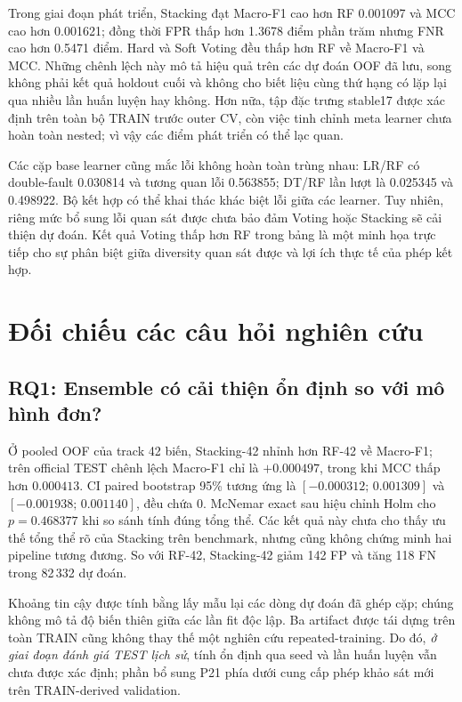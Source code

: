 Trong giai đoạn phát triển, Stacking đạt Macro-F1 cao hơn RF 0.001097 và MCC cao hơn 0.001621; đồng thời FPR thấp hơn 1.3678 điểm phần trăm nhưng FNR cao hơn 0.5471 điểm. Hard và Soft Voting đều thấp hơn RF về Macro-F1 và MCC. Những chênh lệch này mô tả hiệu quả trên các dự đoán OOF đã lưu, song không phải kết quả holdout cuối và không cho biết liệu cùng thứ hạng có lặp lại qua nhiều lần huấn luyện hay không. Hơn nữa, tập đặc trưng stable17 được xác định trên toàn bộ TRAIN trước outer CV, còn việc tinh chỉnh meta learner chưa hoàn toàn nested; vì vậy các điểm phát triển có thể lạc quan.

Các cặp base learner cũng mắc lỗi không hoàn toàn trùng nhau: LR/RF có double-fault 0.030814 và tương quan lỗi 0.563855; DT/RF lần lượt là 0.025345 và 0.498922. Bộ kết hợp có thể khai thác khác biệt lỗi giữa các learner. Tuy nhiên, riêng mức bổ sung lỗi quan sát được chưa bảo đảm Voting hoặc Stacking sẽ cải thiện dự đoán. Kết quả Voting thấp hơn RF trong bảng là một minh họa trực tiếp cho sự phân biệt giữa diversity quan sát được và lợi ích thực tế của phép kết hợp.

\section{Đối chiếu các câu hỏi nghiên cứu}
\label{sec:revision-rq-all}

\subsection{RQ1: Ensemble có cải thiện ổn định so với mô hình đơn?}
\label{sec:revision-rq1}
Ở pooled OOF của track 42 biến, Stacking-42 nhỉnh hơn RF-42 về Macro-F1; trên official TEST chênh lệch Macro-F1 chỉ là $+0.000497$, trong khi MCC thấp hơn $0.000413$. CI paired bootstrap 95\% tương ứng là $[-0.000312;\,0.001309]$ và $[-0.001938;\,0.001140]$, đều chứa 0. McNemar exact sau hiệu chỉnh Holm cho $p=0.468377$ khi so sánh tính đúng tổng thể. Các kết quả này chưa cho thấy ưu thế tổng thể rõ của Stacking trên benchmark, nhưng cũng không chứng minh hai pipeline tương đương. So với RF-42, Stacking-42 giảm 142 FP và tăng 118 FN trong 82\,332 dự đoán.

Khoảng tin cậy được tính bằng lấy mẫu lại các dòng dự đoán đã ghép cặp; chúng không mô tả độ biến thiên giữa các lần fit độc lập. Ba artifact được tái dựng trên toàn TRAIN cũng không thay thế một nghiên cứu repeated-training. Do đó, \emph{ở giai đoạn đánh giá TEST lịch sử}, tính ổn định qua seed và lần huấn luyện vẫn chưa được xác định; phần bổ sung P21 phía dưới cung cấp phép khảo sát mới trên TRAIN-derived validation.

